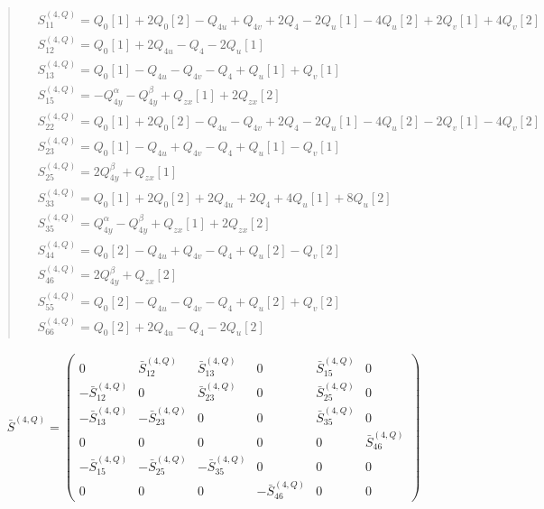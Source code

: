 \documentclass[fleqn,10pt]{jsarticle}
\begin{document}
\begin{quote}
\begin{align*}
& S^{(4,Q)}_{11} = Q_{0}[1] + 2 Q_{0}[2] - Q_{4u} + Q_{4v} + 2 Q_{4} - 2 Q_{u}[1] - 4 Q_{u}[2] + 2 Q_{v}[1] + 4 Q_{v}[2] \\
& S^{(4,Q)}_{12} = Q_{0}[1] + 2 Q_{4u} - Q_{4} - 2 Q_{u}[1] \\
& S^{(4,Q)}_{13} = Q_{0}[1] - Q_{4u} - Q_{4v} - Q_{4} + Q_{u}[1] + Q_{v}[1] \\
& S^{(4,Q)}_{15} = - Q_{4y}^{\alpha} - Q_{4y}^{\beta} + Q_{zx}[1] + 2 Q_{zx}[2] \\
& S^{(4,Q)}_{22} = Q_{0}[1] + 2 Q_{0}[2] - Q_{4u} - Q_{4v} + 2 Q_{4} - 2 Q_{u}[1] - 4 Q_{u}[2] - 2 Q_{v}[1] - 4 Q_{v}[2] \\
& S^{(4,Q)}_{23} = Q_{0}[1] - Q_{4u} + Q_{4v} - Q_{4} + Q_{u}[1] - Q_{v}[1] \\
& S^{(4,Q)}_{25} = 2 Q_{4y}^{\beta} + Q_{zx}[1] \\
& S^{(4,Q)}_{33} = Q_{0}[1] + 2 Q_{0}[2] + 2 Q_{4u} + 2 Q_{4} + 4 Q_{u}[1] + 8 Q_{u}[2] \\
& S^{(4,Q)}_{35} = Q_{4y}^{\alpha} - Q_{4y}^{\beta} + Q_{zx}[1] + 2 Q_{zx}[2] \\
& S^{(4,Q)}_{44} = Q_{0}[2] - Q_{4u} + Q_{4v} - Q_{4} + Q_{u}[2] - Q_{v}[2] \\
& S^{(4,Q)}_{46} = 2 Q_{4y}^{\beta} + Q_{zx}[2] \\
& S^{(4,Q)}_{55} = Q_{0}[2] - Q_{4u} - Q_{4v} - Q_{4} + Q_{u}[2] + Q_{v}[2] \\
& S^{(4,Q)}_{66} = Q_{0}[2] + 2 Q_{4u} - Q_{4} - 2 Q_{u}[2]
\end{align*}
\end{quote}
\begin{align*}
\bar{S}^{(4,Q)} = \begin{pmatrix} 0 & \bar{S}^{(4,Q)}_{12} & \bar{S}^{(4,Q)}_{13} & 0 & \bar{S}^{(4,Q)}_{15} & 0 \\ - \bar{S}^{(4,Q)}_{12} & 0 & \bar{S}^{(4,Q)}_{23} & 0 & \bar{S}^{(4,Q)}_{25} & 0 \\ - \bar{S}^{(4,Q)}_{13} & - \bar{S}^{(4,Q)}_{23} & 0 & 0 & \bar{S}^{(4,Q)}_{35} & 0 \\ 0 & 0 & 0 & 0 & 0 & \bar{S}^{(4,Q)}_{46} \\ - \bar{S}^{(4,Q)}_{15} & - \bar{S}^{(4,Q)}_{25} & - \bar{S}^{(4,Q)}_{35} & 0 & 0 & 0 \\ 0 & 0 & 0 & - \bar{S}^{(4,Q)}_{46} & 0 & 0 \end{pmatrix}
\end{align*}
\end{document}
